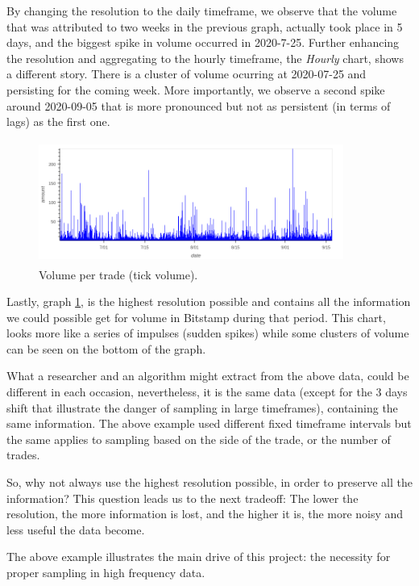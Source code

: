 \documentclass[10pt]{asme2ej}
\begin{document}
By changing the resolution to the daily timeframe, we observe that the volume that was attributed to two weeks in the previous graph, actually took place in 5 days, and the biggest spike in volume occurred in 2020-7-25. Further enhancing the resolution and aggregating to the hourly timeframe, the \textit{Hourly} chart,
shows a different story. There is a cluster of volume ocurring at 2020-07-25 and persisting for
the coming week. More importantly, we observe a second spike around 2020-09-05 that is more pronounced but not as persistent (in terms of lags) as the first one.

\begin{figure}[H]
	\centering
	\includegraphics[width=10cm, height = 4cm]{five.png}
	\caption{Volume per trade (tick volume).}
	\label{fig:tick_vol}
\end{figure}

Lastly, graph \ref{fig:tick_vol}, is the highest resolution possible and contains all the information we could possible get for volume in Bitstamp during that period. This chart, looks more like a series of impulses (sudden spikes) while some clusters of volume can be seen on the bottom of the graph. 

What a researcher and an algorithm might extract from the above data, could be different in
each occasion, nevertheless, it is the same data (except for the 3 days shift that illustrate the danger of sampling in large timeframes), containing the same information. The above example used different fixed timeframe intervals but the same applies to sampling based on the side of the trade, or the number of trades. 

So, why not always use the highest resolution possible, in order to preserve all the information? This question leads us to the next tradeoff: The lower the resolution, the more information is lost, and the higher it is, the more noisy and less useful the data become.

The above example illustrates the main drive of this project: the necessity for proper sampling in high frequency data.

\end{document}
